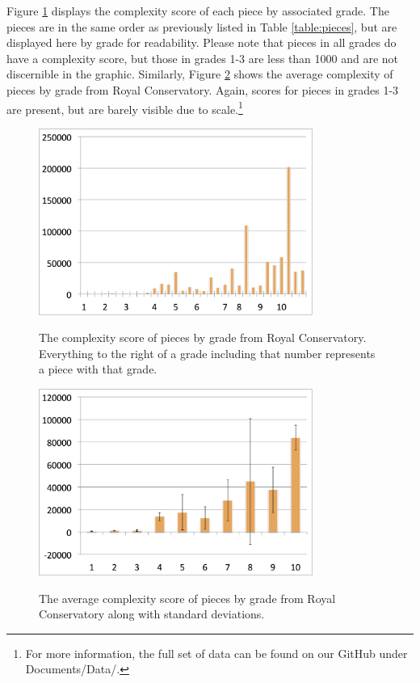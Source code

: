 \documentclass[12pt]{report}
\begin{document}
Figure \ref{image:gradecomplexity} displays the complexity score of each piece by associated grade. The pieces are in the same order as previously listed in Table \ref{table:pieces}, but are displayed here by grade for readability. Please note that pieces in all grades do have a complexity score, but those in grades 1-3 are less than 1000 and are not discernible in the graphic. Similarly, Figure \ref{image:gradeaverage} shows the average complexity of pieces by grade from Royal Conservatory. Again, scores for pieces in grades 1-3 are present, but are barely visible due to scale.\footnote{For more information, the full set of data can be found on our GitHub \cite{GithubMusicScoring} under Documents/Data/.}

\begin{figure}
	\centering
		\caption{The complexity score of pieces by grade from Royal Conservatory. Everything to the right of a grade including that number represents a piece with that grade.}
		\includegraphics[width=0.8\textwidth]{GradesVsComplexityScores.png}
		\label{image:gradecomplexity}
\end{figure}

\begin{figure}
	\centering
		\caption{The average complexity score of pieces by grade from Royal Conservatory along with standard deviations.}
		\includegraphics[width=0.8\textwidth]{GradesVsAverageComplexityScoresSTD.png}
		\label{image:gradeaverage}
\end{figure}
\end{document}
